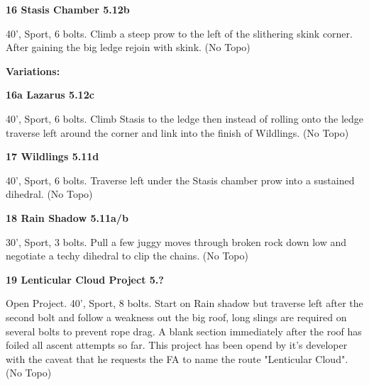 \begin{multicols}{2}
\needspace{1.5cm}
\label{rt:Stasis Chamber}
\colorbox{Goldenrod!50}{
\parbox{0.95\linewidth}{
\textbf{
16 Stasis Chamber 5.12b  
}}}

\begin{adjustwidth}{0.5cm}{}			
40', Sport, 6 bolts. Climb a steep prow to the left of the slithering skink corner. After gaining the big ledge rejoin with skink. (No Topo)
\end{adjustwidth}

\begin{adjustwidth}{0.5cm}{}				
\needspace{3cm}
\textbf{Variations:} \newline

\needspace{1.5cm}
\label{vr:Lazarus}
\colorbox{Goldenrod!50}{
\parbox{0.95\linewidth}{
\textbf{
16a Lazarus 5.12c  
}}}

\begin{adjustwidth}{0.5cm}{}			
40', Sport, 6 bolts. Climb Stasis to the ledge then instead of rolling onto the ledge traverse left around the corner and link into the finish of Wildlings. (No Topo)
\end{adjustwidth}


\end{adjustwidth}


\needspace{1.5cm}
\label{rt:Wildlings}
\colorbox{RoyalBlue!20}{
\parbox{0.95\linewidth}{
\textbf{
17 Wildlings 5.11d  
}}}

\begin{adjustwidth}{0.5cm}{}			
40', Sport, 6 bolts. Traverse left under the Stasis chamber prow into a sustained dihedral. (No Topo)
\end{adjustwidth}



\needspace{1.5cm}
\label{rt:Rain Shadow}
\colorbox{RoyalBlue!20}{
\parbox{0.95\linewidth}{
\textbf{
18 Rain Shadow 5.11a/b  
}}}

\begin{adjustwidth}{0.5cm}{}			
30', Sport, 3 bolts. Pull a few juggy moves through broken rock down low and negotiate a techy dihedral to clip the chains. (No Topo)
\end{adjustwidth}



\needspace{1.5cm}
\label{rt:Lenticular Cloud Project}
\colorbox{black!20}{
\parbox{0.95\linewidth}{
\textbf{
19 Lenticular Cloud Project 5.?  
}}}

\begin{adjustwidth}{0.5cm}{}			
Open Project. 40', Sport, 8 bolts. Start on Rain shadow but traverse left after the second bolt and follow a weakness out the big roof, long slings are required on several bolts to prevent rope drag. A blank section immediately after the roof has foiled all ascent attempts so far. This project has been opend by it's developer with the caveat that he requests the FA to name the route "Lenticular Cloud". (No Topo)
\end{adjustwidth}




\end{multicols}
